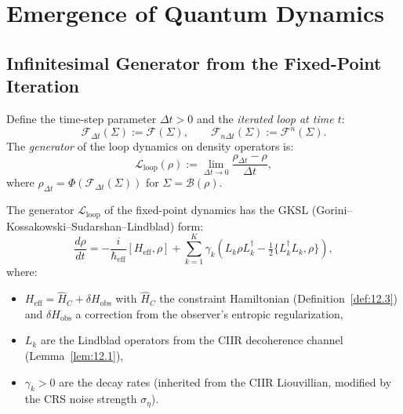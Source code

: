 \section{Emergence of Quantum Dynamics}
\label{sec:ch13:dynamics}

\subsection{Infinitesimal Generator from the Fixed-Point Iteration}

\begin{definition}\label{def:13.9}
\label{sec:ch13:continuum}
Define the time-step parameter $\Delta t > 0$ and the \emph{iterated
loop at time $t$}:
\[
  \mathcal{F}_{\Delta t}(\Sigma) := \mathcal{F}(\Sigma),
  \qquad
  \mathcal{F}_{n\Delta t}(\Sigma) := \mathcal{F}^n(\Sigma).
\]
The \emph{generator} of the loop dynamics on density operators is:
\begin{equation}\label{eq:generator}
  \mathcal{L}_{\mathrm{loop}}(\rho) :=
  \lim_{\Delta t \to 0}
  \frac{\rho_{\Delta t} - \rho}{\Delta t},
\end{equation}
where $\rho_{\Delta t} = \Phi(\mathcal{F}_{\Delta t}(\Sigma))$ for
$\Sigma = \mathcal{B}(\rho)$.
\end{definition}

\begin{theorem}\label{thm:13.6}
The generator $\mathcal{L}_{\mathrm{loop}}$ of the fixed-point
dynamics has the GKSL (Gorini--Kossakowski--Sudarshan--Lindblad) form:
\begin{equation}\label{eq:gksl-loop}
  \boxed{
  \frac{d\rho}{dt}
  = -\frac{i}{\hbar_{\mathrm{eff}}}[H_{\mathrm{eff}},\rho]
  + \sum_{k=1}^K \gamma_k \left(
    L_k \rho L_k^\dagger
    - \tfrac{1}{2}\{L_k^\dagger L_k, \rho\}
  \right),
  }
\end{equation}
where:
\begin{itemize}
  \item $H_{\mathrm{eff}} = \hat{H}_C + \delta H_{\mathrm{obs}}$
    with $\hat{H}_C$ the constraint Hamiltonian
    (Definition~\ref{def:12.3}) and $\delta H_{\mathrm{obs}}$ a
    correction from the observer's entropic regularization,
  \item $L_k$ are the Lindblad operators from the CIIR decoherence
    channel (Lemma~\ref{lem:12.1}),
  \item $\gamma_k > 0$ are the decay rates (inherited from the CIIR
    Liouvillian, modified by the CRS noise strength $\sigma_\eta$).
\end{itemize}
\end{theorem}

